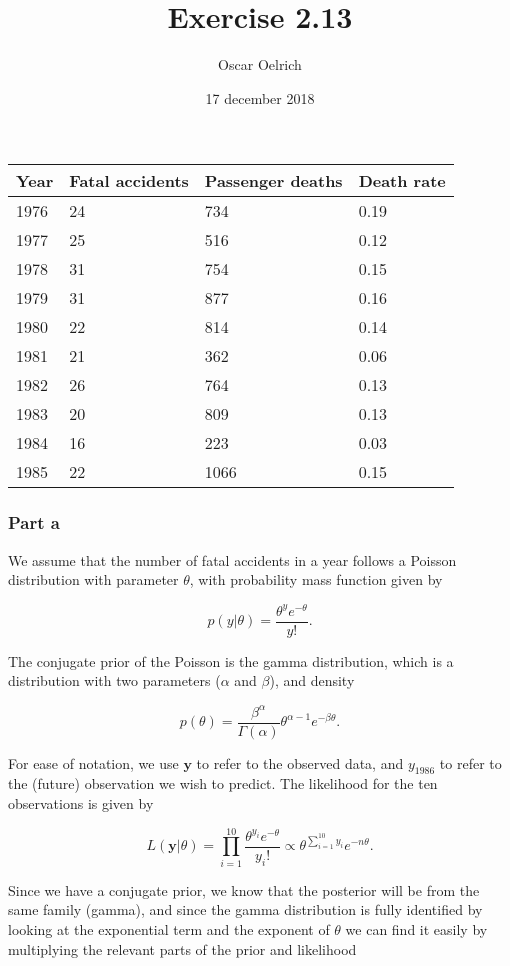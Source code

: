\documentclass[]{article}
\title{Exercise 2.13}
\author{Oscar Oelrich}
\date{17 december 2018}
\begin{document}
\maketitle

\begin{longtable}[]{@{}llll@{}}
\toprule
Year & Fatal accidents & Passenger deaths & Death rate\tabularnewline
\midrule
\endhead
1976 & 24 & 734 & 0.19\tabularnewline
1977 & 25 & 516 & 0.12\tabularnewline
1978 & 31 & 754 & 0.15\tabularnewline
1979 & 31 & 877 & 0.16\tabularnewline
1980 & 22 & 814 & 0.14\tabularnewline
1981 & 21 & 362 & 0.06\tabularnewline
1982 & 26 & 764 & 0.13\tabularnewline
1983 & 20 & 809 & 0.13\tabularnewline
1984 & 16 & 223 & 0.03\tabularnewline
1985 & 22 & 1066 & 0.15\tabularnewline
\bottomrule
\end{longtable}

\hypertarget{part-a}{%
\subsubsection{Part a}\label{part-a}}

We assume that the number of fatal accidents in a year follows a Poisson
distribution with parameter \(\theta\), with probability mass function
given by

\[\begin{equation}
p(y|\theta) = \frac{\theta^y e^{-\theta}}{y!}.
\end{equation}\]

The conjugate prior of the Poisson is the gamma distribution, which is a
distribution with two parameters (\(\alpha\) and \(\beta\)), and density

\[\begin{equation}
p(\theta)=\frac{\beta^{\alpha}}{\Gamma(\alpha)} \theta^{\alpha-1}e^{-\beta \theta}.
\end{equation}\]

For ease of notation, we use \(\boldsymbol{y}\) to refer to the observed
data, and \(y_1986\) to refer to the (future) observation we wish to
predict. The likelihood for the ten observations is given by

\[\begin{equation}
L(\boldsymbol{y}|\theta)=\prod_{i=1}^{10}\frac{\theta^{y_i} e^{-\theta}}{y_i!} \propto \theta^{\sum_{i=1}^{10} y_i}e^{-n\theta}.
\end{equation}\]

Since we have a conjugate prior, we know that the posterior will be from
the same family (gamma), and since the gamma distribution is fully
identified by looking at the exponential term and the exponent of
\(\theta\) we can find it easily by multiplying the relevant parts of
the prior and likelihood
\end{document}
